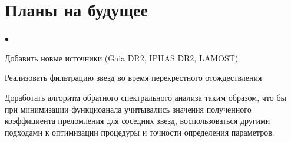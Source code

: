 \documentclass[12pt, a4paper]{article}
\newenvironment{compactlist}{
    \begin{list}{{$\bullet$}}{
      \setlength\partopsep{0pt}
      \setlength\parskip{0pt}
      \setlength\parsep{0pt}
      \setlength\topsep{0pt}
      \setlength\itemsep{0pt}
} }{
\end{list} }
\begin{document}
	\section{Планы на будущее}
	\begin{compactlist}
		\item Добавить новые источники (Gaia DR2, IPHAS DR2, LAMOST)
		\item Реализовать фильтрацию звезд во время перекрестного отождествления
		\item Доработать алгоритм обратного спектрального анализа таким образом, что бы при минимизации функциоанала учитывались значения полученного коэффициента преломления для соседних звезд, воспользоваться другими подходами к оптимизации процедуры и точности определения параметров.
	\end{compactlist}
\end{document}
